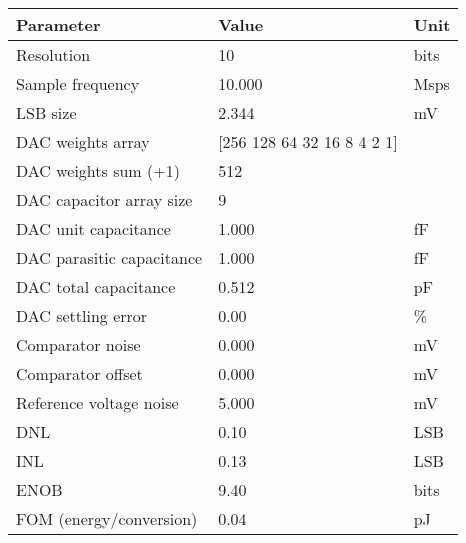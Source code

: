 \begin{tabular}{lll}
\toprule
Parameter & Value & Unit \\
\midrule
Resolution & 10 & bits \\
Sample frequency & 10.000 & Msps \\
LSB size & 2.344 & mV \\
DAC weights array & [256 128  64  32  16   8   4   2   1] &  \\
DAC weights sum (+1) & 512 &  \\
DAC capacitor array size & 9 &  \\
DAC unit capacitance & 1.000 & fF \\
DAC parasitic capacitance & 1.000 & fF \\
DAC total capacitance & 0.512 & pF \\
DAC settling error & 0.00 & \% \\
Comparator noise & 0.000 & mV \\
Comparator offset & 0.000 & mV \\
Reference voltage noise & 5.000 & mV \\
DNL & 0.10 & LSB \\
INL & 0.13 & LSB \\
ENOB & 9.40 & bits \\
FOM (energy/conversion) & 0.04 & pJ \\
\bottomrule
\end{tabular}

